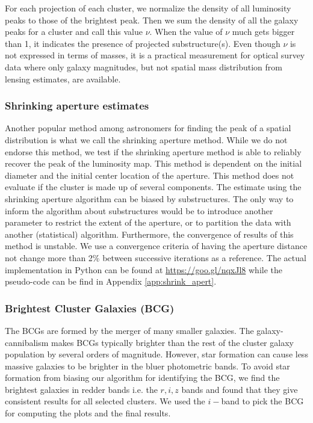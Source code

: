 For each projection of each cluster, we normalize the density of all 
luminosity peaks to those of the brightest peak. 
Then we sum the density of all the galaxy peaks for a cluster and call this value
$\nu$. When the value of $\nu$ much gets bigger than 1, it indicates the presence 
of projected substructure(s). Even though 
$\nu$ is not expressed in terms of masses, it is a practical measurement
for optical survey data where only galaxy magnitudes, but not spatial mass distribution from lensing
estimates, are available. 

\subsubsection{Shrinking aperture estimates}

Another popular method among astronomers for finding the peak of a spatial
distribution is what we call the shrinking aperture method.
While we do not endorse this method,
we test if the shrinking aperture method is able to reliably recover the 
peak of the luminosity map.
This method is dependent on the initial diameter and the initial center 
location of the aperture.
This method does not evaluate if the cluster is made up of
several components.
The estimate using the shrinking aperture algorithm can be biased by
substructures. The only way to inform the algorithm about substructures would
be to introduce another parameter to restrict the extent of the aperture, or to
partition the data with another (statistical) algorithm.
Furthermore, the convergence of results of this method is unstable. We use a
convergence criteria of having the aperture distance not change more than 2\% 
between successive iterations as a reference. The actual implementation in
Python can be found at \href{https://goo.gl/nqxJl8}{https://goo.gl/nqxJl8} while
the pseudo-code can be find in Appendix \ref{app:shrink_apert}.

\subsubsection{Brightest Cluster Galaxies (BCG)}
The BCGs are formed by the merger of many smaller
galaxies. The galaxy-cannibalism makes BCGs typically brighter than the rest of 
the cluster galaxy population by several orders of magnitude. 
However, star formation can cause
less massive galaxies to be brighter in the bluer photometric bands.
To avoid star formation from biasing our algorithm for identifying the
BCG, we find the brightest galaxies in redder bands i.e. the $r, i, z$
bands and found that they give consistent results for all selected clusters. 
We used the $i-$band to pick the BCG for computing the plots and the final results. 

